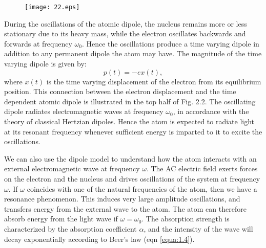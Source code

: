 \documentclass[12pt]{book}
\begin{document}
\begin{figure}[htbp]
  \texttt{[image: 22.eps]}\\
  \label{fig:2.2}
\end{figure}


During the oscillations of the atomic dipole, the nucleus remains more or less stationary due to its heavy mass, while the electron oscillates backwards and forwards at frequency $\omega_0$. Hence the oscillations produce a time varying dipole in addition to any permanent dipole the atom may have. The magnitude of the time varying dipole is given by:
\begin{equation}\label{equa:2.4}
p(t) = -ex(t),
\end{equation}
where $x(t)$ is the time varying displacement of the electron from its equilibrium position. This connection between the electron displacement and the time dependent atomic dipole is illustrated in the top half of Fig. 2.2. The oscillating dipole radiates electromagnetic waves at frequency $\omega_0$, in accordance with the theory of classical Hertzian dipoles. Hence the atom is expected to radiate light at its resonant frequency whenever sufficient energy is imparted to it to excite the oscillations.


We can also use the dipole model to understand how the atom interacts with an external electromagnetic wave at frequency $\omega$. The AC electric field exerts forces on the electron and the nucleus and drives oscillations of the system at frequency $\omega$. If $\omega$ coincides with one of the natural frequencies of the atom, then we have a resonance phenomenon. This induces very large amplitude oscillations, and transfers energy from the external wave to the atom. The atom can therefore absorb energy from the light wave if $\omega=\omega_0$. The absorption strength is characterized by the absorption coefficient $\alpha$, and the intensity of the wave will decay exponentially according to Beer's law (eqn \ref{equa:1.4}).
\end{document}
